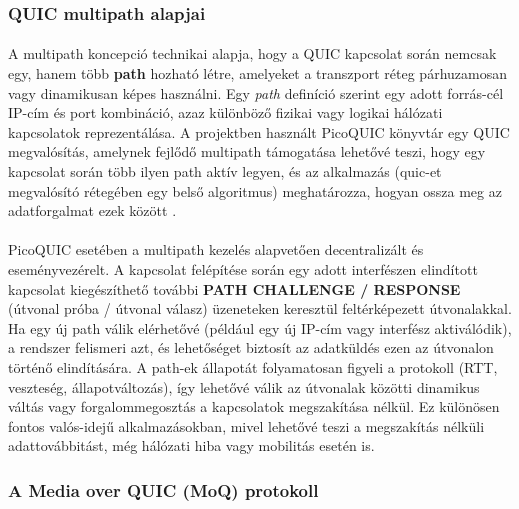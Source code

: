 \documentclass[a4paper,oneside]{article}
\begin{document}
\subsubsection{QUIC multipath alapjai}
\paragraph{}
A multipath koncepció technikai alapja, hogy a QUIC kapcsolat során nemcsak egy, 
hanem több \textbf{path}
hozható létre, amelyeket a transzport réteg párhuzamosan vagy dinamikusan képes használni. 
Egy \emph{path} definíció szerint egy adott forrás-cél IP-cím és port kombináció, azaz 
különböző fizikai vagy logikai hálózati kapcsolatok reprezentálása. 
A projektben használt PicoQUIC könyvtár egy QUIC megvalósítás, amelynek fejlődő multipath 
támogatása lehetővé teszi, hogy egy kapcsolat során több ilyen path aktív legyen, és az 
alkalmazás (quic-et megvalósító rétegében egy belső algoritmus) meghatározza, 
hogyan ossza meg az adatforgalmat ezek között \cite{pico_git}.
\paragraph{}
PicoQUIC esetében a multipath kezelés alapvetően decentralizált és eseményvezérelt. 
A kapcsolat felépítése során egy adott interfészen elindított kapcsolat kiegészíthető 
további \textbf{PATH CHALLENGE / RESPONSE} (útvonal próba / útvonal válasz) üzeneteken keresztül feltérképezett 
útvonalakkal. Ha egy új path válik elérhetővé (például egy új IP-cím vagy interfész 
aktiválódik), a rendszer felismeri azt, és lehetőséget biztosít az adatküldés ezen 
az útvonalon történő elindítására. A path-ek állapotát folyamatosan figyeli a protokoll 
(RTT, veszteség, állapotváltozás), így lehetővé válik az útvonalak közötti dinamikus 
váltás vagy forgalommegosztás a kapcsolatok megszakítása nélkül. Ez különösen 
fontos valós-idejű alkalmazásokban, mivel lehetővé teszi a megszakítás nélküli adattovábbitást, 
még hálózati hiba vagy mobilitás esetén is.

\subsubsection{A Media over QUIC (MoQ) protokoll}
\paragraph{}
\end{document}
